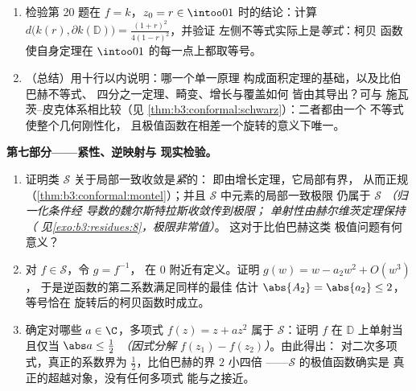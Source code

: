 \begin{problem}
\begin{enumerate}[resume]
{        且 $\psi$ 为将 $0$ 映到
        $z_0$ 的圆盘自同构）}。为何 $\partial f(\mathbb D)$ 非空？
  \item 检验第 20 题在 $f = k$，$z_0 = r \in
        \intoo01$ 时的结论：计算 $d\bigl(k(r), \partial k(\mathbb
        D)\bigr) = \frac{(1+r)^2}{4(1-r)^2}$，并验证
        左侧不等式实际上是\emph{等式}：柯贝
        函数使自身定理在
        $\intoo01$ 的每一点上都取等号。
  \item （总结）用十行以内说明：哪一个单一原理
        构成面积定理的基础，以及比伯巴赫不等式、
        四分之一定理、畸变、增长与覆盖如何
        皆由其导出？可与
        施瓦茨--皮克体系相比较（见
        \cref{thm:b3:conformal:schwarz}）：二者都由一个
        不等式使整个几何刚性化，
        且极值函数在相差一个旋转的意义下唯一。

\end{enumerate}
\medskip
\noindent\textbf{第七部分——紧性、逆映射与
现实检验。}
\begin{enumerate}[resume]
  \item 证明类 $\mathcal S$ 关于局部一致收敛是\emph{紧}的：
        即由增长定理，它局部有界，
        从而正规
        （\cref{thm:b3:conformal:montel}）；并且
        $\mathcal S$ 中元素的局部一致极限
        仍属于 $\mathcal S$ \emph{（归一化条件经
        导数的魏尔斯特拉斯收敛传到极限；
        单射性由赫尔维茨定理保持（
        见\cref{exo:b3:residues:8}，极限非常值）}。
        这对于比伯巴赫这类
        极值问题有何意义？
  \item 对 $f \in \mathcal S$，令 $g = f^{-1}$，
        在 $0$ 附近有定义。证明 $g(w) = w - a_2w^2 + O(w^3)$，
        于是逆函数的第二系数满足同样的最佳
        估计 $\abs{A_2} = \abs{a_2} \leq 2$，等号恰在
        旋转后的柯贝函数时成立。
  \item 确定对哪些 $a \in \C$，多项式 $f(z)
        = z + az^2$ 属于 $\mathcal S$：证明 $f$ 在
        $\mathbb D$ 上单射当且仅当 $\abs a \leq \frac12$
        \emph{（因式分解 $f(z_1) - f(z_2)$）}。由此得出：
        对二次多项式，真正的系数界为
        $\frac12$，比伯巴赫的界 $2$ 小四倍
——$\mathcal S$ 的极值函数确实是
        真正的超越对象，没有任何多项式
        能与之接近。
\end{enumerate}
\end{problem}
